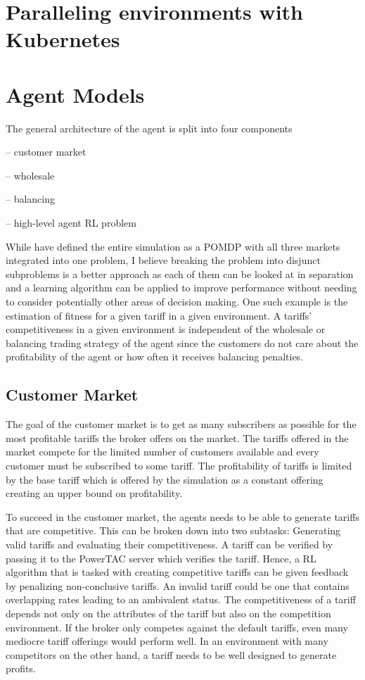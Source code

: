 \section{Paralleling environments with Kubernetes}

\section{Agent Models}

The general architecture of the agent is split into four components

-- customer market

-- wholesale 

-- balancing 

-- high-level agent \ac {RL} problem

While \citeauthor{tactexurieli2016mdp} have defined the entire simulation as a \ac {POMDP} with all three markets
integrated into one problem, I believe breaking the problem into disjunct subproblems is a better approach as each of
them can be looked at in separation and a learning algorithm can be applied to improve performance without needing to
consider potentially other areas of decision making. One such example is the estimation of fitness for a given tariff in
a given environment. A tariffs' competitiveness in a given environment is independent of the wholesale or balancing
trading strategy of the agent since the customers do not care about the profitability of the agent or how often it
receives balancing penalties.

\subsection{Customer Market}

The goal of the customer market is to get as many subscribers as possible for the most profitable tariffs the broker
offers on the market. The tariffs offered in the market compete for the limited number of customers available and every
customer must be subscribed to some tariff. The profitability of tariffs is limited by the base tariff which is offered
by the simulation as a constant offering creating an upper bound on profitability. 

To succeed in the customer market, the agents needs to be able to generate tariffs that are competitive. This can be
broken down into two subtasks: Generating valid tariffs and evaluating their competitiveness. A tariff can be
verified by passing it to the \ac {PowerTAC} server which verifies the tariff. Hence, a \ac {RL} algorithm that is
tasked with creating competitive tariffs can be given feedback by penalizing non-conclusive tariffs. An invalid tariff
could be one that contains overlapping rates leading to an ambivalent status. The competitiveness of a tariff depends
not only on the attributes of the tariff but also on the competition environment. If the broker only competes against
the default tariffs, even many mediocre tariff offerings would perform well. In an environment with many competitors on
the other hand, a tariff needs to be well designed to generate profits. 


